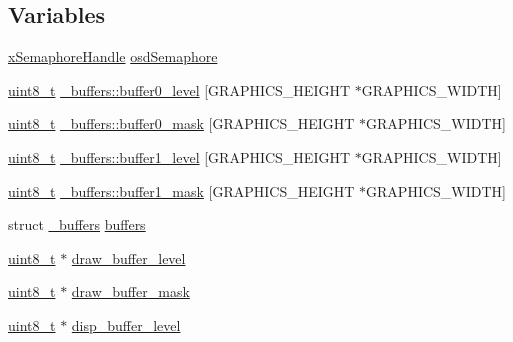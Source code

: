 \subsection*{Variables}
\begin{DoxyCompactItemize}
\item 
\hyperlink{_common_2_libraries_2_free_r_t_o_s_2_source_2include_2semphr_8h_aa91aa1b6835a184838f9ccf138a6ad10}{x\-Semaphore\-Handle} \hyperlink{group___p_i_o_s___v_i_d_e_o_ga34f96a89a1ad6c4649787dbc18e218e5}{osd\-Semaphore}
\item 
\hyperlink{stdint_8h_aba7bc1797add20fe3efdf37ced1182c5}{uint8\-\_\-t} \hyperlink{group___p_i_o_s___v_i_d_e_o_ga3b52f2bd3c15f12d7a7257c5d8ff2627}{\-\_\-buffers\-::buffer0\-\_\-level} \mbox{[}G\-R\-A\-P\-H\-I\-C\-S\-\_\-\-H\-E\-I\-G\-H\-T $\ast$G\-R\-A\-P\-H\-I\-C\-S\-\_\-\-W\-I\-D\-T\-H\mbox{]}
\item 
\hyperlink{stdint_8h_aba7bc1797add20fe3efdf37ced1182c5}{uint8\-\_\-t} \hyperlink{group___p_i_o_s___v_i_d_e_o_ga9620d63e32309e41277c6dd2dc8ee2ae}{\-\_\-buffers\-::buffer0\-\_\-mask} \mbox{[}G\-R\-A\-P\-H\-I\-C\-S\-\_\-\-H\-E\-I\-G\-H\-T $\ast$G\-R\-A\-P\-H\-I\-C\-S\-\_\-\-W\-I\-D\-T\-H\mbox{]}
\item 
\hyperlink{stdint_8h_aba7bc1797add20fe3efdf37ced1182c5}{uint8\-\_\-t} \hyperlink{group___p_i_o_s___v_i_d_e_o_ga63add1136b802684b982c920c01ae697}{\-\_\-buffers\-::buffer1\-\_\-level} \mbox{[}G\-R\-A\-P\-H\-I\-C\-S\-\_\-\-H\-E\-I\-G\-H\-T $\ast$G\-R\-A\-P\-H\-I\-C\-S\-\_\-\-W\-I\-D\-T\-H\mbox{]}
\item 
\hyperlink{stdint_8h_aba7bc1797add20fe3efdf37ced1182c5}{uint8\-\_\-t} \hyperlink{group___p_i_o_s___v_i_d_e_o_gad0338825ac9f4f66d1f1cc5147b69aa7}{\-\_\-buffers\-::buffer1\-\_\-mask} \mbox{[}G\-R\-A\-P\-H\-I\-C\-S\-\_\-\-H\-E\-I\-G\-H\-T $\ast$G\-R\-A\-P\-H\-I\-C\-S\-\_\-\-W\-I\-D\-T\-H\mbox{]}
\item 
struct \hyperlink{struct__buffers}{\-\_\-buffers} \hyperlink{group___p_i_o_s___v_i_d_e_o_gaec9bffb1068ac55e742a1e7b6e449273}{buffers}
\item 
\hyperlink{stdint_8h_aba7bc1797add20fe3efdf37ced1182c5}{uint8\-\_\-t} $\ast$ \hyperlink{group___p_i_o_s___v_i_d_e_o_ga52b5c0fc86a398ddf62c5b2bb383374d}{draw\-\_\-buffer\-\_\-level}
\item 
\hyperlink{stdint_8h_aba7bc1797add20fe3efdf37ced1182c5}{uint8\-\_\-t} $\ast$ \hyperlink{group___p_i_o_s___v_i_d_e_o_ga67085db0125b910109083e4d2605d7d5}{draw\-\_\-buffer\-\_\-mask}
\item 
\hyperlink{stdint_8h_aba7bc1797add20fe3efdf37ced1182c5}{uint8\-\_\-t} $\ast$ \hyperlink{group___p_i_o_s___v_i_d_e_o_gac6ace302511130c48032b40f32a40bb8}{disp\-\_\-buffer\-\_\-level}

\end{DoxyCompactItemize}
